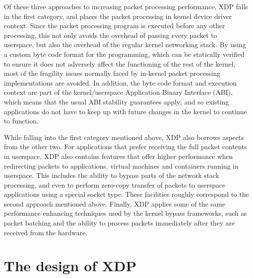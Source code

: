 \documentclass[sigconf]{acmart}
\begin{document}
Of these three approaches to increasing packet processing performance, XDP falls
in the first category, and places the packet processing in kernel device driver
context. Since the packet processing program is executed before any other
processing, this not only avoids the overhead of passing every packet to
userspace, but also the overhead of the regular kernel networking stack. By
using a custom byte code format for the programming, which can be statically
verified to ensure it does not adversely affect the functioning of the rest of
the kernel, most of the fragility issues normally faced by in-kernel packet
processing implementations are avoided. In addition, the byte code format and
execution context are part of the kernel/userspace Application Binary Interface
(ABI), which means that the usual ABI stability guarantees apply; and so
existing applications do not have to keep up with future changes in the kernel
to continue to function.

While falling into the first category mentioned above, XDP also borrows aspects
from the other two. For applications that prefer receiving the full packet
contents in userspace, XDP also contains features that offer higher performance
when redirecting packets to applications, virtual machines and containers
running in userspace. This includes the ability to bypass parts of the network
stack processing, and even to perform zero-copy transfer of packets to userspace
applications using a special socket type. These facilities roughly correspond to
the second approach mentioned above. Finally, XDP applies some of the same
performance enhancing techniques used by the kernel bypass frameworks, such as
packet batching and the ability to process packets immediately after they are
received from the hardware.

\section{The design of XDP}
\label{sec:design}
\end{document}
